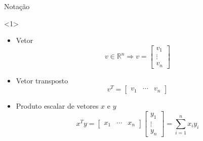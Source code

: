 \documentclass[]{beamer}
\newcommand{\R}{\mathbb{R}}
\begin{document}
\begin{frame}{Notação}
  
  \begin{onlyenv}<1>
    \begin{itemize}
    \item Vetor
      \[
      v \in \R^n \Rightarrow v =
      \begin{bmatrix}
        v_1\\ \vdots \\ v_n
      \end{bmatrix}
      \]

    \item Vetor transposto
      \[
      v^T =
      \begin{bmatrix}
        v_1 & \cdots & v_n
      \end{bmatrix}
      \]

    \item Produto escalar de vetores $x$ e $y$
      \[
      x^T y =
      \begin{bmatrix}
        x_1 & \cdots & x_n
      \end{bmatrix}
      \begin{bmatrix}
        y_1\\ \vdots\\ y_n
      \end{bmatrix}
      = \sum \limits_{i = 1}^n x_i y_i
      \]
    \end{itemize}
  \end{onlyenv}


\end{frame}
\end{document}
